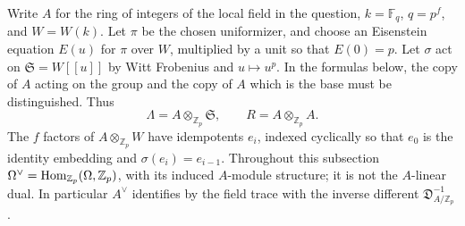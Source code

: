Write $A$ for the ring of integers of the local field in the question, $k=\mathbb F_q$, $q=p^f$, and $W=W(k)$.  Let $\pi$ be the chosen uniformizer, and choose an Eisenstein equation $E(u)$ for $\pi$ over $W$, multiplied by a unit so that $E(0)=p$.  Let $\sigma$ act on $\mathfrak S=W[[u]]$ by Witt Frobenius and $u\mapsto u^p$.  In the formulas below, the copy of $A$ acting on the group and the copy of $A$ which is the base must be distinguished.  Thus
\[
 \Lambda=A\otimes_{\mathbb Z_p}\mathfrak S,
 \qquad R=A\otimes_{\mathbb Z_p}A.
\]
The $f$ factors of $A\otimes_{\mathbb Z_p}W$ have idempotents $e_i$, indexed cyclically so that $e_0$ is the identity embedding and $\sigma(e_i)=e_{i-1}$.  Throughout this subsection $\Omega^\vee=\operatorname{Hom}_{\mathbb Z_p}(\Omega,\mathbb Z_p)$, with its induced $A$-module structure; it is not the $A$-linear dual.  In particular $A^\vee$ identifies by the field trace with the inverse different $\mathfrak D_{A/\mathbb Z_p}^{-1}$.


